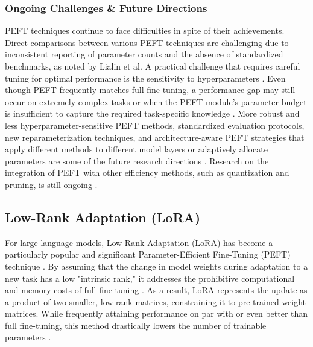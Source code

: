 \documentclass{DESSThesis}
\begin{document}
\subsubsection{Ongoing Challenges \& Future Directions}
PEFT techniques continue to face difficulties in spite of their achievements. Direct comparisons between various PEFT techniques are challenging due to inconsistent reporting of parameter counts and the absence of standardized benchmarks, as noted by Lialin et al. A practical challenge that requires careful tuning for optimal performance is the sensitivity to hyperparameters \cite{lialin_scaling_2023}. Even though PEFT frequently matches full fine-tuning, a performance gap may still occur on extremely complex tasks or when the PEFT module's parameter budget is insufficient to capture the required task-specific knowledge \cite{biderman_lora_2024,mao_survey_2025}. More robust and less hyperparameter-sensitive PEFT methods, standardized evaluation protocols, new reparameterization techniques, and architecture-aware PEFT strategies that apply different methods to different model layers or adaptively allocate parameters are some of the future research directions \cite{lialin_scaling_2023,pfeiffer_modular_2024}. Research on the integration of PEFT with other efficiency methods, such as quantization and pruning, is still ongoing \cite{lialin_scaling_2023,mao_survey_2025}.

\subsection{Low-Rank Adaptation (LoRA)}
For large language models, Low-Rank Adaptation (LoRA) has become a particularly popular and significant Parameter-Efficient Fine-Tuning (PEFT) technique \cite{hu_lora_2021,mao_survey_2025}. By assuming that the change in model weights during adaptation to a new task has a low "intrinsic rank," it addresses the prohibitive computational and memory costs of full fine-tuning \cite{hu_lora_2021}. As a result, LoRA represents the update as a product of two smaller, low-rank matrices, constraining it to pre-trained weight matrices. While frequently attaining performance on par with or even better than full fine-tuning, this method drastically lowers the number of trainable parameters \cite{hu_lora_2021,lialin_scaling_2023}.
\end{document}
